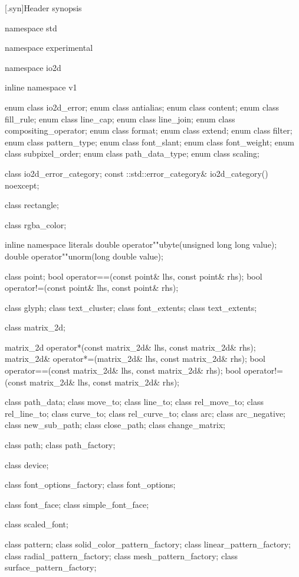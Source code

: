 [\iotwod.syn]{Header  synopsis}

%
\begin{codeblock}

namespace std { namespace experimental { namespace io2d { inline namespace v1 {
  enum class io2d_error;
  enum class antialias;
  enum class content;
  enum class fill_rule;
  enum class line_cap;
  enum class line_join;
  enum class compositing_operator;
  enum class format;
  enum class extend;
  enum class filter;
  enum class pattern_type;
  enum class font_slant;
  enum class font_weight;
  enum class subpixel_order;
  enum class path_data_type;
  enum class scaling;

  class io2d_error_category;
  const ::std::error_category& io2d_category() noexcept;

  class rectangle;

  class rgba_color;

  inline namespace literals {
    double operator""ubyte(unsigned long long value);
    double operator""unorm(long double value);
  }
  
  class point;
  bool operator==(const point& lhs, const point& rhs);
  bool operator!=(const point& lhs, const point& rhs);

  class glyph;
  class text_cluster;
  class font_extents;
  class text_extents;

  class matrix_2d;

  matrix_2d operator*(const matrix_2d& lhs, const matrix_2d& rhs);
  matrix_2d& operator*=(matrix_2d& lhs, const matrix_2d& rhs);
  bool operator==(const matrix_2d& lhs, const matrix_2d& rhs);
  bool operator!=(const matrix_2d& lhs, const matrix_2d& rhs);

  class path_data;
  class move_to;
  class line_to;
  class rel_move_to;
  class rel_line_to;
  class curve_to;
  class rel_curve_to;
  class arc;
  class arc_negative;
  class new_sub_path;
  class close_path;
  class change_matrix;
  
  class path;
  class path_factory;
  
  class device;

  class font_options_factory;
  class font_options;

  class font_face;
  class simple_font_face;

  class scaled_font;

  class pattern;
  class solid_color_pattern_factory;
  class linear_pattern_factory;
  class radial_pattern_factory;
  class mesh_pattern_factory;
  class surface_pattern_factory;
  
}}}}
\end{codeblock}
